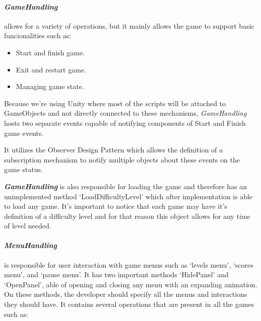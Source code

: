 
\newpage
\paragraph{\textit{GameHandling}} allows for a variety of operations, but it mainly allows the game to support basic funcionalities such as:

\vspace{-\topsep}  %
\begin{itemize}
    \setlength{\itemsep}{8pt}  %
    \setlength{\parskip}{0pt}  %
    \item Start and finish game.
    \item Exit and restart game.
    \item Managing game state.
\end{itemize}
\vspace{-\topsep}  %

Because we're using Unity where most of the scripts will be attached to GameObjects and not directly connected to these mechanisms, \textit{GameHandling} hosts two separate events capable of notifying components of Start and Finish game events.

It utilizes the Observer Design Pattern \cite{observer} which allows the definition of a subscription mechanism to notify multiple objects about these events on the game status.

\textbf{\textit{GameHandling}} is also responsible for loading the game and therefore has an unimplemented method `LoadDifficultyLevel' which after implementation is able to load any game. It's important to notice that each game may have it's definition of a difficulty level and for that reason this object allows for any time of level needed.\\

\paragraph{\textit{MenuHandling}} is responsible for user interaction with game menus such as `levels menu', `scores menu', and `pause menu'. It has two important methods `HidePanel' and `OpenPanel', able of opening and closing any menu with an expanding animation. On these methods, the developer should specify all the menus and interactions they should have. It contains several operations that are present in all the games such as:

